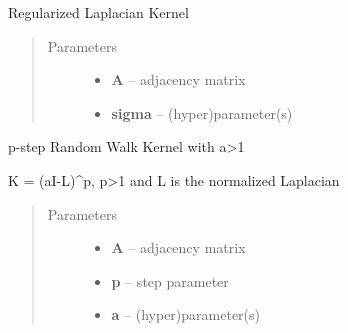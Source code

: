 \documentclass[letterpaper,10pt,english]{sphinxmanual}
\begin{document}

\begin{fulllineitems}
\label{pyGPs.GraphExtension:pyGPs.GraphExtension.nodeKernels.regLapKernel}
Regularized Laplacian Kernel
\begin{quote}\begin{description}
\item[{Parameters}] \leavevmode\begin{itemize}
\item {} 
\textbf{A} -- adjacency matrix

\item {} 
\textbf{sigma} -- (hyper)parameter(s)

\end{itemize}

\end{description}\end{quote}

\end{fulllineitems}


\begin{fulllineitems}
\label{pyGPs.GraphExtension:pyGPs.GraphExtension.nodeKernels.rwKernel}
p-step Random Walk Kernel with a\textgreater{}1

K = (aI-L)\textasciicircum{}p, p\textgreater{}1 and L is the normalized Laplacian
\begin{quote}\begin{description}
\item[{Parameters}] \leavevmode\begin{itemize}
\item {} 
\textbf{A} -- adjacency matrix

\item {} 
\textbf{p} -- step parameter

\item {} 
\textbf{a} -- (hyper)parameter(s)

\end{itemize}

\end{description}\end{quote}

\end{fulllineitems}
\end{document}
